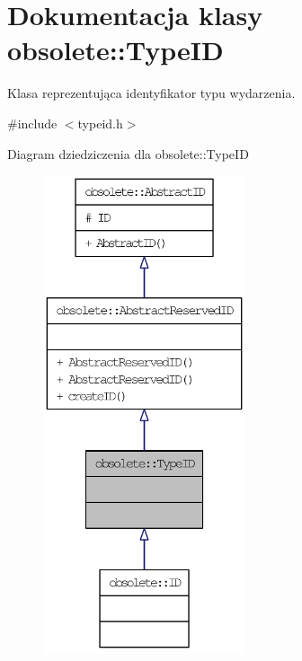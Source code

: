 \hypertarget{classobsolete_1_1TypeID}{
\section{Dokumentacja klasy obsolete::TypeID}
\label{classobsolete_1_1TypeID}
}


Klasa reprezentująca identyfikator typu wydarzenia.  




{\ttfamily \#include $<$typeid.h$>$}



Diagram dziedziczenia dla obsolete::TypeID\nopagebreak
\begin{figure}[H]
\begin{center}
\leavevmode
\includegraphics[height=400pt]{classobsolete_1_1TypeID__inherit__graph}
\end{center}
\end{figure}


